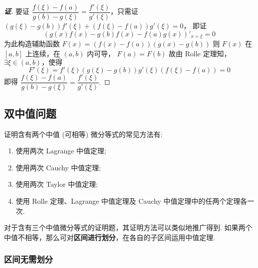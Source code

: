 \begin{proof}[{\songti \textbf{证}}]
    要证 $\dfrac{f(\xi)-f(a)}{g(b)-g(\xi)}=\dfrac{f'(\xi)}{g'(\xi)}$，只需证 $(g(\xi)-g(b))f'(\xi)+(f(\xi)-f(a))g'(\xi)=0$，
    即证 $$(g(x)f(x)-g(b)f(x)-f(a)g(x))'_{x=\xi}=0$$
    为此构造辅助函数 $F(x)=(f(x)-f(a))(g(x)-g(b))$ 则 $F(x)$ 在 $[a,b]$ 上连续，在 $(a,b)$ 内可导，
    $F(a)=F(b)$ 故由 Rolle 定理知，$\exists\xi\in(a,b)\text{，使得 }$
    $$F'(\xi)=f'(\xi)(g(\xi)-g(b))g'(\xi)(f(\xi)-f(a))=0$$
    即得 $\dfrac{f(\xi)-f(a)}{g(b)-g(\xi)}=\dfrac{f'(\xi)}{g'(\xi)}.$
\end{proof}

\subsection{双中值问题}

证明含有两个中值 (可相等) 微分等式的常见方法有:
\begin{enumerate}[label=(\arabic{*})]
    \item 使用两次 Lagrange 中值定理;
    \item 使用两次 Cauchy 中值定理;
    \item 使用两次 Taylor 中值定理;
    \item 使用 Rolle 定理、Lagrange 中值定理及 Cauchy 中值定理中的任两个定理各一次.
\end{enumerate}
对于含有三个中值微分等式的证明题，其证明方法可以类似地推广得到.
如果两个中值不相等，那么可对\textbf{区间进行划分}，在各自的子区间运用中值定理.

\subsubsection{区间无需划分}

